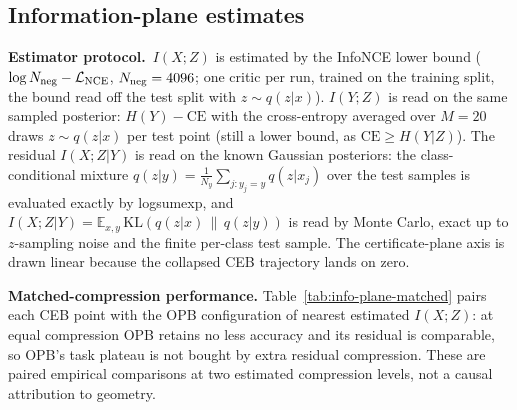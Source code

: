 \subsection{Information-plane estimates}
\label{app:info-plane}
\textbf{Estimator protocol.}\ $I(X;Z)$ is estimated by the InfoNCE lower bound
\citep{oord2018representation} ($\log N_{\rm neg}-\mathcal{L}_{\mathrm{NCE}}$, $N_{\rm neg}=4096$; one
critic per run, trained on the training split, the bound read off the test split with
$z\sim q(z|x)$). $I(Y;Z)$ is read on the same sampled posterior: $H(Y)-\mathrm{CE}$
with the cross-entropy averaged over $M=20$ draws $z\sim q(z|x)$ per test point
(still a lower bound, as $\mathrm{CE}\ge H(Y|Z)$). The residual $I(X;Z|Y)$ is
read on the known Gaussian posteriors: the class-conditional mixture
$q(z|y)=\frac{1}{N_y}\sum_{j:y_j=y}q(z|x_j)$ over the test samples is evaluated
exactly by logsumexp, and
$I(X;Z|Y)=\mathbb{E}_{x,y}\,\mathrm{KL}(q(z|x)\,\|\,q(z|y))$ is read by Monte
Carlo, exact up to $z$-sampling noise and the finite per-class test sample. The
certificate-plane axis is drawn linear because the collapsed CEB trajectory lands
on zero.

\textbf{Matched-compression performance.}
Table~\ref{tab:info-plane-matched} pairs each CEB point with the OPB configuration
of nearest estimated $I(X;Z)$: at equal compression OPB retains no less accuracy
and its residual is comparable, so OPB's task plateau is not bought by extra
residual compression. These are paired empirical comparisons at two estimated
compression levels, not a causal attribution to geometry.

